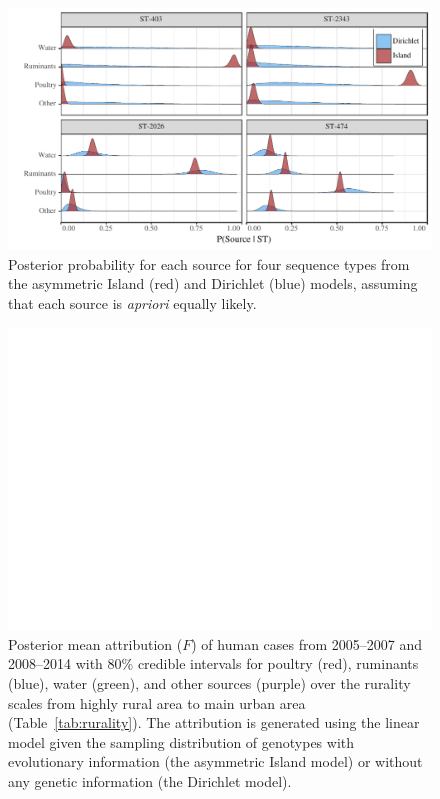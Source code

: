 \documentclass[AMA,STIX1COL]{WileyNJD-v2}
\begin{document}
\begin{figure}
\centering
\includegraphics[width=.9\linewidth]{Figures/genotype_figure.pdf}
\caption{Posterior probability for each source for four sequence types from the asymmetric Island (red) and Dirichlet (blue) models, assuming that each source is \emph{apriori} equally likely.}
\label{fig:genotype_dist}
\end{figure}

\begin{figure}
\centering
\includegraphics[width=.9\linewidth]{Figures/attr_intervention.pdf}
\caption{Posterior mean attribution ($F$) of human cases from 2005--2007 and 2008--2014 with 80\% credible intervals for poultry (red), ruminants (blue), water (green), and other sources (purple) over the rurality scales from highly rural area to main urban area (Table~\ref{tab:rurality}). The attribution is generated using the linear model given the sampling distribution of genotypes with evolutionary information (the asymmetric Island model) or without any genetic information (the Dirichlet model).}
\label{fig:intervention}
\end{figure}
\end{document}
